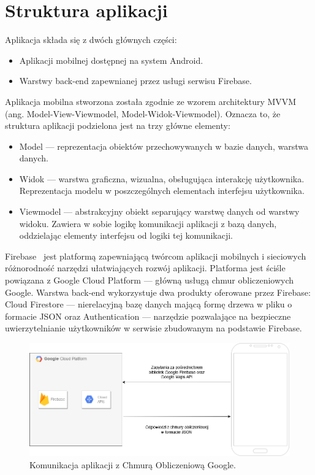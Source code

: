 \newpage
\section{Struktura aplikacji}\label{struktura}
\vspace{1cm}
    Aplikacja składa się z dwóch głównych części: 
    \begin{itemize}
        \item Aplikacji mobilnej dostępnej na system Android.
        \item Warstwy back-end zapewnianej przez usługi serwisu Firebase. \\
    \end{itemize}

    Aplikacja mobilna stworzona została zgodnie ze wzorem architektury MVVM (ang. Model-View-Viewmodel, Model-Widok-Viewmodel). Oznacza to, że struktura aplikacji
    podzielona jest na trzy główne elementy: 
    \begin{itemize}
        \item Model — reprezentacja obiektów przechowywanych w bazie danych, warstwa danych.
        \item Widok — warstwa graficzna, wizualna, obsługująca interakcję użytkownika. Reprezentacja modelu w poszczególnych elementach interfejsu użytkownika.
        \item Viewmodel — abstrakcyjny obiekt separujący warstwę danych od warstwy widoku. Zawiera w sobie logikę komunikacji aplikacji z bazą danych,
        oddzielając elementy interfejsu od logiki tej komunikacji.
    \end{itemize}
    
    Firebase~\cite{FIREBASE_MAIN} jest platformą zapewniającą twórcom aplikacji mobilnych i sieciowych różnorodność narzędzi ułatwiających rozwój aplikacji. Platforma jest ściśle powiązana z 
    Google Cloud Platform — główną usługą chmur obliczeniowych Google. Warstwa back-end wykorzystuje dwa produkty oferowane przez Firebase: Cloud Firestore — 
    nierelacyjną bazę danych mającą formę drzewa w pliku o formacie JSON oraz Authentication — narzędzie pozwalające na bezpieczne uwierzytelnianie użytkowników 
    w serwisie zbudowanym na podstawie Firebase. \\ 

    \begin{figure}[!ht]%
        \centering
        \includegraphics[scale=0.45]{src/comunication with google cloud.png}
        \caption{Komunikacja aplikacji z Chmurą Obliczeniową Google.\label{communication}}
        \qquad
    \end{figure} 

